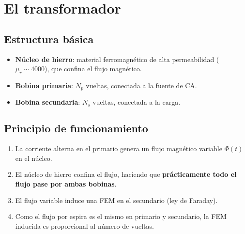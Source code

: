 \documentclass[12pt,a4paper]{article}
\begin{document}
\section{El transformador}

\subsection{Estructura básica}

\begin{itemize}
  \item \textbf{Núcleo de hierro}: material ferromagnético de alta
        permeabilidad (\(\mu_r \sim 4000\)), que confina el flujo
        magnético.
  \item \textbf{Bobina primaria}: \(N_p\) vueltas, conectada a la
        fuente de CA.
  \item \textbf{Bobina secundaria}: \(N_s\) vueltas, conectada a la
        carga.
\end{itemize}



\subsection{Principio de funcionamiento}

\begin{enumerate}
  \item La corriente alterna en el primario genera un flujo
        magnético variable \(\Phi(t)\) en el núcleo.
  \item El núcleo de hierro confina el flujo, haciendo que
        \textbf{prácticamente todo el flujo pase por ambas bobinas}.
  \item El flujo variable induce una FEM en el secundario
        (ley de Faraday).
  \item Como el flujo por espira es el mismo en primario y
        secundario, la FEM inducida es proporcional al número de
        vueltas.
\end{enumerate}

\end{document}
